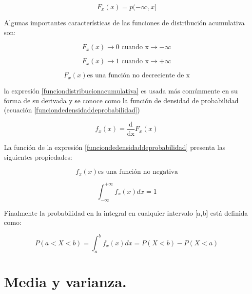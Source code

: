 \begin{equation}\label{funciondistribucionacumulativa}
F_{x}(x)= p(-\infty,x]
\end{equation}

Algunas importantes características de las funciones de distribución acumulativa son:

\begin{equation}\label{0cuandoxmenosinfinito}
F_{x}(x) \to \textrm{0 cuando x} \to -\infty
\end{equation}

\begin{equation}\label{1cuandoxmasinfinito}
F_{x}(x) \to \textrm{1 cuando x} \to +\infty
\end{equation}

\begin{equation}\label{funcionnodecreciente}
F_{x}(x) \textrm{es una función no decreciente de x} 
\end{equation}

la expresión \ref{funciondistribucionacumulativa} es usada más comúnmente en su forma de su derivada y se conoce como la función de densidad de probabilidad (ecuación \ref{funciondedensidaddeprobabilidad})

\begin{equation}\label{funciondedensidaddeprobabilidad}
f_{x}(x)=  \frac{\textrm{d}}{\textrm{dx}}F_{x}(x)
\end{equation}

La función de la expresión \ref{funciondedensidaddeprobabilidad} presenta las siguientes propiedades:

\begin{equation}\label{funciondensidaddeprobabilidadnonegativa}
f_{x}(x) \textrm{es una función no negativa} 
\end{equation}

\begin{equation}\label{probabilidaddelaintegraldensidaddeprobabilidad}
\int_{-\infty}^{+\infty}f_{x}(x)dx = 1  
\end{equation}

Finalmente la probabilidad en la integral en cualquier intervalo [a,b] está definida como:

\begin{equation}\label{integraldensidaddeprobabilidad}
P(a < X < b) = \int_{a}^{b}f_{x}(x)dx = P(X < b) - P(X < a)
\end{equation}

\section{Media y varianza.}

